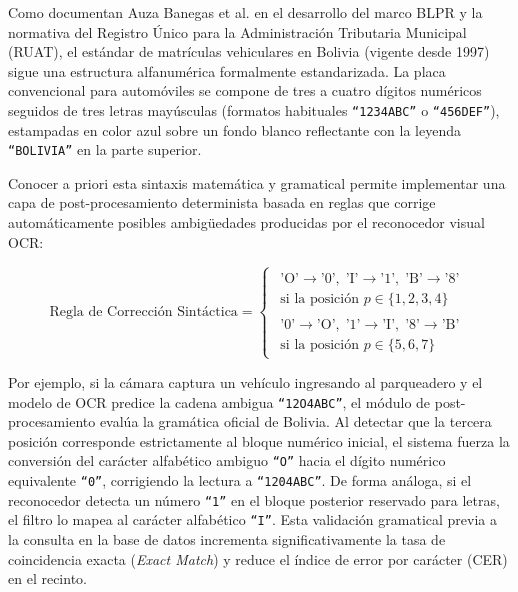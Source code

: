 Como documentan Auza Banegas et al. \cite{auzabanegas2026blpr} en el desarrollo
del marco BLPR y la normativa del Registro Único para la Administración
Tributaria Municipal (RUAT), el estándar de matrículas vehiculares en Bolivia
(vigente desde 1997) sigue una estructura alfanumérica formalmente estandarizada.
La placa convencional para automóviles se compone de tres a cuatro dígitos
numéricos seguidos de tres letras mayúsculas (formatos habituales
\texttt{``1234ABC''} o \texttt{``456DEF''}), estampadas en color azul sobre un fondo
blanco reflectante con la leyenda \texttt{``BOLIVIA''} en la parte superior.

Conocer a priori esta sintaxis matemática y gramatical permite implementar una
capa de post-procesamiento determinista basada en reglas que corrige
automáticamente posibles ambigüedades producidas por el reconocedor visual OCR:

\begin{equation}
    \text{Regla de Corrección Sintáctica} =
    \begin{cases} 
        \begin{array}{l}
            \text{'O'} \rightarrow \text{'0'}, \; \text{'I'} \rightarrow \text{'1'}, \; \text{'B'} \rightarrow \text{'8'} \\
            \text{si la posición } p \in \{1, 2, 3, 4\}
        \end{array} \\[3ex]
        \begin{array}{l}
            \text{'0'} \rightarrow \text{'O'}, \; \text{'1'} \rightarrow \text{'I'}, \; \text{'8'} \rightarrow \text{'B'} \\
            \text{si la posición } p \in \{5, 6, 7\}
        \end{array}
    \end{cases}
\end{equation}

Por ejemplo, si la cámara captura un vehículo ingresando al parqueadero y el
modelo de OCR predice la cadena ambigua \texttt{``12O4ABC''}, el módulo de
post-procesamiento evalúa la gramática oficial de Bolivia. Al detectar que la
tercera posición corresponde estrictamente al bloque numérico inicial, el
sistema fuerza la conversión del carácter alfabético ambiguo \texttt{``O''} hacia
el dígito numérico equivalente \texttt{``0''}, corrigiendo la lectura a
\texttt{``1204ABC''}. De forma análoga, si el reconocedor detecta un número
\texttt{``1''} en el bloque posterior reservado para letras, el filtro lo mapea al
carácter alfabético \texttt{``I''}. Esta validación gramatical previa a la
consulta en la base de datos incrementa significativamente la tasa de
coincidencia exacta (\textit{Exact Match}) y reduce el índice de error por
carácter (CER) en el recinto.

